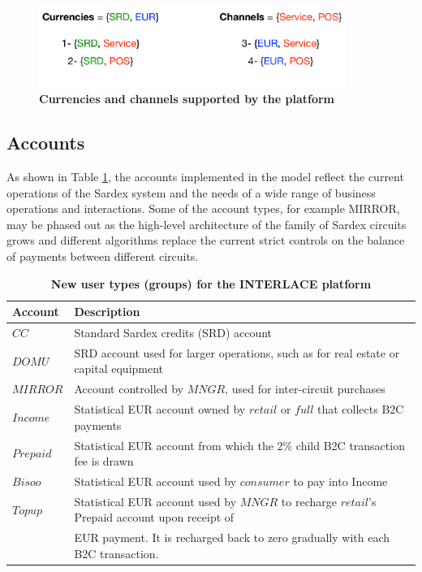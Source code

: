 \vspace{-0.3cm}
\begin{figure}[h]
\centering
\includegraphics[width=10cm]{Figures/Curr_Chan}
\caption{\small\textbf{Currencies and channels supported by the platform}}
\label{fig:currchan}
\end{figure}

\subsection{Accounts}
As shown in Table \ref{tab:accounts}, the accounts implemented in the model reflect the current operations of the Sardex system and the needs of a wide range of business operations and interactions. Some of the account types, for example MIRROR, may be phased out as the high-level architecture of the family of Sardex circuits grows and different algorithms replace the current strict controls on the balance of payments between different circuits.

\setlength{\tabcolsep}{10pt}
\begin{table}[htbp]
\begin{centering}
\small
{
\begin{tabular}{| l | l | }
\hline
\textbf{Account}	& \textbf{Description} \\
\hline
$CC$ & Standard Sardex credits (SRD) account \\
\hline
$DOMU$ & SRD account used for larger operations, such as for real estate or capital equipment\\
\hline
$MIRROR$ & Account controlled by $MNGR$, used for inter-circuit purchases \\
\hline
$Income$ & Statistical EUR account owned by $retail$ or $full$ that collects B2C payments\\
\hline
$Prepaid$ & Statistical EUR account from which the 2\% child B2C transaction fee is drawn \\
\hline
$Bisoo$ & Statistical EUR account used by $consumer$ to pay into Income \\
\hline
$Topup$ & Statistical EUR account used by $MNGR$ to recharge $retail$'s Prepaid account upon receipt of \\
&\hspace{0.5cm} EUR payment. It is recharged back to zero gradually with each B2C transaction. \\
\hline
\end{tabular}
}
\caption{\small\textbf{New user types (groups) for the INTERLACE platform}}
\label{tab:accounts}
\vspace{-0.5cm}
\end{centering}
\end{table}

